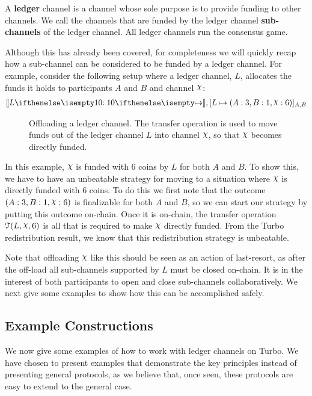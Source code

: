 A \textbf{ledger} channel is a channel whose sole purpose is to provide funding to other channels.
We call the channels that are funded by the ledger channel \textbf{sub-channels} of the ledger channel.
All ledger channels run the consensus game.

Although this has already been covered, for completeness we will quickly recap how a sub-channel can be considered to be funded by a ledger channel.
For example, consider the following setup where a ledger channel, $L$, allocates the funds it holds to participants $A$ and $B$ and channel $\rchi$:
\begin{align}
  \adj{\holds{L}{10}{}}, \finalizable{L}{\alloc{A: 3, B: 1, \rchi: 6}}{A, B}
\end{align}
\begin{figure}[h]\centering
  \makebox[\textwidth][c]{}
  \caption{
    Offloading a ledger channel.
    The transfer operation is used to move funds out of the ledger channel $L$ into channel $\rchi$, so that $\rchi$ becomes directly funded.
  }\label{fig:ledger-offload}
\end{figure}
In this example, $\rchi$ is funded with 6 coins by $L$ for both $A$ and $B$.
To show this, we have to have an unbeatable strategy for moving to a situation where $\rchi$ is directly funded with 6 coins.
To do this we first note that the outcome $\alloc{A: 3, B: 1, \rchi: 6}$ is finalizable for both $A$ and $B$, so we can start our strategy by putting this outcome on-chain.
Once it is on-chain, the transfer operation $\transfer{L}{\rchi}{6}$ is all that is required to make $\rchi$ directly funded.
From the Turbo redistribution result, we know that this redistribution strategy is unbeatable.

Note that offloading $\rchi$ like this should be seen as an action of last-resort, as after the off-load all sub-channels supported by $L$ must be closed on-chain.
It is in the interest of both participants to open and close sub-channels collaboratively.
We next give some examples to show how this can be accomplished safely.

\subsection{Example Constructions}

We now give some examples of how to work with ledger channels on Turbo.
We have chosen to present examples that demonstrate the key principles instead of presenting general protocols, as we believe that, once seen, these protocols are easy to extend to the general case.

